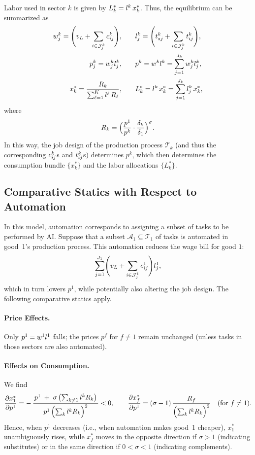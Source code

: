 \documentclass{article}
\theoremstyle{plain}
\theoremstyle{plain}
\begin{document}
Labor used in sector $k$ is given by $L_k^* = l_{}^k\,x_k^*$.
Thus, the equilibrium can be summarized as
\begin{align*}
w_j^k = \Biggl(v_L + \sum_{i \in \mathcal{J}_j^k} c_{ij}^{k}\Biggr), 
& \qquad
l_{j}^k = \Biggl(t_{sj}^k + \sum_{i \in \mathcal{J}_j^k} t_{ij}^{k}\Biggr), \\
p_j^k = w_j^k l_{j}^k,
& \qquad
p^k = w^k l_{}^k = \sum_{j=1}^{J_k} w_j^k l_{j}^k, \\
x_k^* = \frac{R_k}{\sum_{\ell=1}^K l_{}^\ell\,R_\ell},
& \qquad
L_k^* = l_{}^k\,x_k^* = \sum_{j=1}^{J_k} l_{j}^k\,x_k^*,
\end{align*}
where
\[
R_k = \Bigl(\frac{p^1}{p^k} \cdot \frac{\delta_k}{\delta_1}\Bigr)^{\sigma}.
\]
In this way, the job design of the production process $\mathcal{T}_k$ (and thus the corresponding $c_{ij}^k$s and $t_{ij}^k$s) determines $p^k$, which then determines the consumption bundle $\{x_k^*\}$ and the labor allocations $\{L_k^*\}$.


\subsection{Comparative Statics with Respect to Automation}

In this model, automation corresponds to assigning a subset of tasks to be performed by AI.  
Suppose that a subset $\mathcal{A}_1 \subseteq \mathcal{T}_1$ of tasks is automated in good~1’s production process.  
This automation reduces the wage bill for good $1$:
\[
\sum_{j=1}^{J_1} \Biggl( v_L + \sum_{i \in \mathcal{J}_j^1} c_{ij}^{1} \Biggr) l_{j}^1,
\]
which in turn lowers $p^1$, while potentially also altering the job design.  
The following comparative statics apply.

\paragraph{Price Effects.}
Only $p^1 = w^1 l_{}^1$ falls; the prices $p^f$ for $f\neq 1$ remain unchanged (unless tasks in those sectors are also automated).

\paragraph{Effects on Consumption.}
We find
\[
\frac{\partial x_{1}^*}{\partial p^1}
=
-\,
\frac{\,p^1 \;+\;\sigma\,\bigl(\sum_{k\neq 1}l_{}^kR_{k}\bigr)\,}{
       p^1\,\Bigl(\sum_{k}l_{}^kR_{k}\Bigr)^{2}}
<0,
\qquad
\frac{\partial x_{f}^*}{\partial p^1}
=
(\sigma-1)
\,\frac{\,R_{f}\,}{\Bigl(\sum_{k}l_{}^kR_{k}\Bigr)^{2}}
\quad (\text{for } f\neq 1).
\]
Hence, when $p^1$ decreases (i.e., when automation makes good~1 cheaper), $x_{1}^*$ unambiguously rises, while $x_{f}^*$ moves in the opposite direction if $\sigma>1$ (indicating substitutes) or in the same direction if $0<\sigma<1$ (indicating complements).
\end{document}
